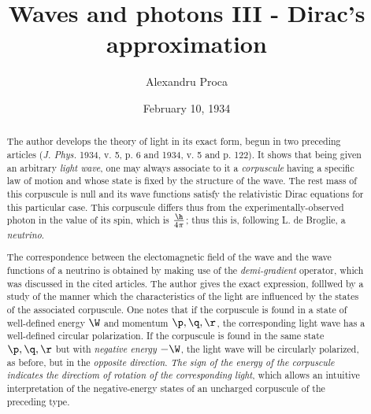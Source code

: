 \documentclass{article}
\author{Alexandru Proca}
\date{February 10, 1934}
\title{Waves and photons III - Dirac's approximation}
\renewcommand{\it}[1]{\textit{#1}}
\begin{document}
\maketitle

\begin{abstract}
The author develops the theory of light in its exact form, begun in two preceding articles (\it{J. Phys.} 1934, v. 5, p. 6 and 1934, v. 5 and p. 122). It shows that being given an arbitrary \it{light wave}, one may always associate to it a \it{corpuscule} having a specific law of motion and whose state is fixed by the structure of the wave. The rest mass of this corpuscule is null and its wave functions satisfy the relativistic Dirac equations for this particular case. This corpuscule differs thus from the experimentally-observed photon in the value of its spin, which is $\frac{\h}{4\pi}$; thus this is, following L. de Broglie, a \it{neutrino}.

The correspondence between the electomagnetic field of the wave and the wave functions of a neutrino is obtained by making use of the \it{demi-gradient} operator, which was discussed in the cited articles. The author gives the exact expression, folllwed by a study of the manner which the characteristics of the light are influenced by the states of the associated corpuscule. One notes that if the corpuscule is found in a state of well-defined energy $\W$ and momentum $\p, \q, \r$, the corresponding light wave has a well-defined circular polarization. If the corpuscule is found in the same state $\p, \q, \r$ but with \it{negative energy} $-\W$, the light wave will be circularly polarized, as before, but in the \it{opposite direction}. \it{The sign of the energy of the corpuscule indicates the directiom of rotation of the corresponding light}, which allows an intuitive interpretation of the negative-energy states of an uncharged corpuscule of the preceding type.
\end{abstract}
\end{document}
